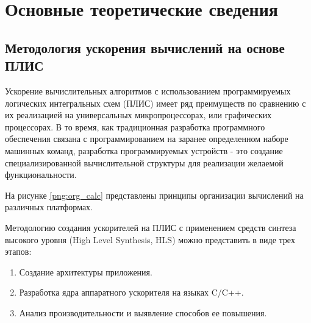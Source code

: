 \chapter{Основные теоретические сведения}

\section{Методология ускорения вычислений на основе ПЛИС}

Ускорение вычислительных алгоритмов с использованием программируемых логических интегральных схем (ПЛИС) имеет ряд преимуществ по сравнению с их реализацией на универсальных микропроцессорах, или графических процессорах. В то время, как традиционная разработка программного обеспечения связана с программированием на заранее определенном наборе машинных команд, разработка программируемых устройств - это создание специализированной вычислительной структуры для реализации желаемой функциональности.

На рисунке \ref{png:org_calc} представлены принципы организации вычислений на различных платформах.

\begin{figure}[H]
	\captionsetup{justification=centering}
\end{figure}

Методологию создания ускорителей на ПЛИС с применением средств синтеза высокого уровня (High Level Synthesis, HLS) можно представить в виде трех этапов:
\begin{enumerate}
	\item Создание архитектуры приложения.
	\item Разработка ядра аппаратного ускорителя на языках C/C++.
	\item Анализ производительности и выявление способов ее повышения.
\end{enumerate}


